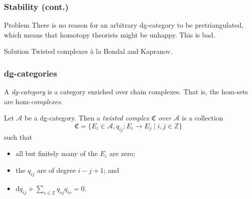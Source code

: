 \documentclass{beamer}
\begin{document}
        \begin{frame}\frametitle{Stability (cont.)}
            \begin{alertblock}{Problem}
                There is no reason for an arbitrary dg-category to be pretriangulated, which means that homotopy theorists might be unhappy.
                This is bad.
            \end{alertblock}

            \pause

            \begin{block}{Solution}
                Twisted complexes à la Bondal and Kapranov.
            \end{block}
        \end{frame}

        \begin{frame}\frametitle{dg-categories}
            \begin{definition}
                A \emph{dg-category} is a category enriched over chain complexes.
                That is, the hom-sets are hom-\emph{complexes}.
            \end{definition}

            \pause

            \begin{definition}
                Let $\mathcal{A}$ be a dg-category.
                Then a \emph{twisted complex $\mathfrak{C}$ over $\mathcal{A}$} is a collection
                \begin{equation*}
                    \mathfrak{C} = \{E_i\in\mathcal{A},q_{ij}\colon E_i\to E_j\mid i,j\in\mathbb{Z}\}
                \end{equation*}
                such that
                \begin{itemize}
                    \item all but finitely many of the $E_i$ are zero;
                    \item the $q_{ij}$ are of degree $i-j+1$; and
                    \item $\mathrm{d}q_{ij}+\sum_{s\in\mathbb{Z}} q_{sj}q_{is}=0$.
                \end{itemize}
            \end{definition}
        \end{frame}
\end{document}
